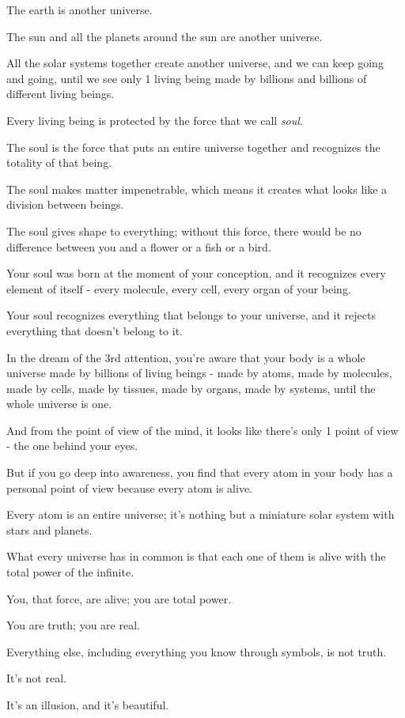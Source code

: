 \documentclass{article}
\numberwithin{equation}{section}
\begin{document}
The earth is another universe.

The sun and all the planets around the sun are another universe.

All the solar systems together create another universe, and we can keep going and going, until we see only 1 living being made by billions and billions of different living beings.

%
Every living being is protected by the force that we call \textit{soul}.

The soul is the force that puts an entire universe together and recognizes the totality of that being.

The soul makes matter impenetrable, which means it creates what looks like a division between beings.

The soul gives shape to everything; without this force, there would be no difference between you and a flower or a fish or a bird.

Your soul was born at the moment of your conception, and it recognizes every element of itself - every molecule, every cell, every organ of your being.

Your soul recognizes everything that belongs to your universe, and it rejects everything that doesn't belong to it.

In the dream of the 3rd attention, you're aware that your body is a whole universe made by billions of living beings - made by atoms, made by molecules, made by cells, made by tissues, made by organs, made by systems, until the whole universe is one.

And from the point of view of the mind, it looks like there's only 1 point of view - the one behind your eyes.

But if you go deep into awareness, you find that every atom in your body has a personal point of view because every atom is alive.

Every atom is an entire universe; it's nothing but a miniature solar system with stars and planets.

What every universe has in common is that each one of them is alive with the total power of the infinite.

%
You, that force, are alive; you are total power.

You are truth; you are real.

Everything else, including everything you know through symbols, is not truth.

It's not real.

It's an illusion, and it's beautiful.
\end{document}
